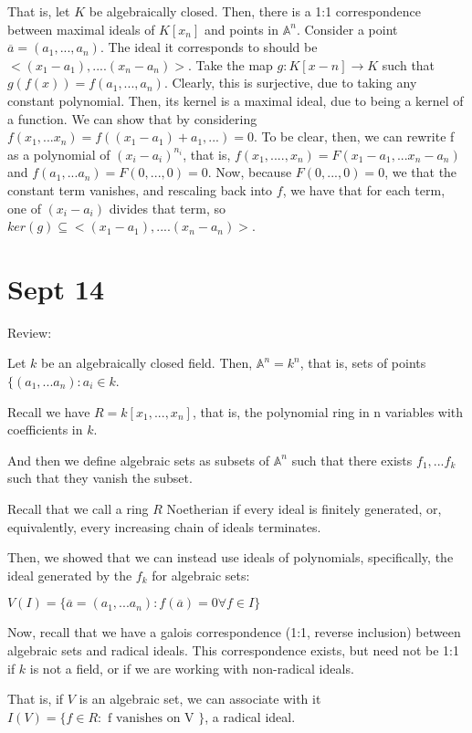 \documentclass[10pt]{article}
\begin{document}
That is, let $K$ be algebraically closed. Then, there is a 1:1 correspondence between maximal ideals of $K[x_n]$ and points in $\mathbb{A}^n$. Consider a point $\overline{a} = (a_1,...,a_n)$. The ideal it corresponds to should be $<(x_1-a_1),....(x_n-a_n)>$. Take the map $g: K[x-n] \rightarrow K$ such that $g(f(x)) = f(a_1,...,a_n)$. Clearly, this is surjective, due to taking any constant polynomial. Then, its kernel is a maximal ideal, due to being a kernel of a function. We can show that by considering $f(x_1,...x_n) = f((x_1-a_1) +a_1,...) = 0$. To be clear, then, we can rewrite f as a polynomial of $(x_i - a_i)^{n_i}$, that is, $f(x_1,....,x_n) = F(x_1-a_1,...x_n-a_n)$ and $f(a_1,...a_n) = F(0,...,0) = 0$. Now, because $F(0,...,0) =0$, we that the constant term vanishes, and rescaling back into $f$, we have that for each term, one of $(x_i-a_i)$ divides that term, so $ker(g) \subseteq <(x_1-a_1),....(x_n-a_n)>$.

\section{Sept 14}
Review:

Let $k$ be an algebraically closed field. Then, $\mathbb{A}^n = k^n$, that is, sets of points $\{ (a_1,...a_n) : a_i \in k$.

Recall we have $R = k[x_1,...,x_n]$, that is, the polynomial ring in n variables with coefficients in $k$.

And then we define algebraic sets as subsets of $\mathbb{A}^n$ such that there exists $f_1,...f_k$ such that they vanish the subset.

Recall that we call a ring $R$ Noetherian if every ideal is finitely generated, or, equivalently, every increasing chain of ideals terminates.

Then, we showed that we can instead use ideals of polynomials, specifically, the ideal generated by the $f_k$ for algebraic sets:

$V(I) = \{ \overline{a} = (a_1,...a_n) : f(\overline{a}) = 0 \forall f \in I \}$

Now, recall that we have a galois correspondence (1:1, reverse inclusion) between algebraic sets and radical ideals. This correspondence exists, but need not be 1:1 if $k$ is not a field, or if we are working with non-radical ideals.

That is, if $V$ is an algebraic set, we can associate with it $I(V) = \{ f \in R : \text{ f vanishes on V } \}$, a radical ideal.
\end{document}
